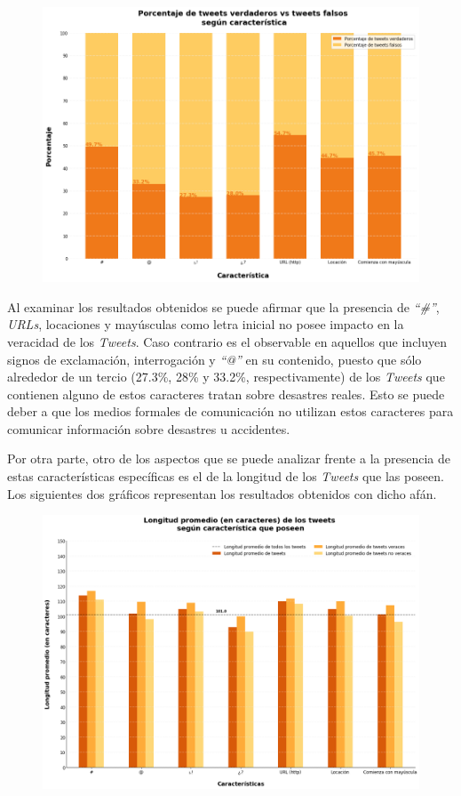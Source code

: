 \documentclass[titlepage,a4paper]{article}
\begin{document}
    \begin{figure}[H]
    \centering
    \includegraphics[width=1\textwidth]{graficos/Analisis Lexico Grafico/porcentaje_caracteristicas.png}
    \caption{} 
    \end{figure}
    
    Al examinar los resultados obtenidos se puede afirmar que la presencia de \textit{``\#''}, \textit{URLs}, locaciones y mayúsculas como letra inicial no posee impacto en la veracidad de los \textit{Tweets}. Caso contrario es el observable en aquellos que incluyen signos de exclamación, interrogación y \textit{``@''} en su contenido, puesto que sólo alrededor de un tercio (27.3\%, 28\% y 33.2\%, respectivamente) de los \textit{Tweets} que contienen alguno de estos caracteres tratan sobre desastres reales. Esto se puede deber a que los medios formales de comunicación no utilizan estos caracteres para comunicar información sobre desastres u accidentes.
    
    Por otra parte, otro de los aspectos que se puede analizar frente a la presencia de estas características específicas es el de la longitud de los \textit{Tweets} que las poseen. Los siguientes dos gráficos representan los resultados obtenidos con dicho afán.

    \begin{figure}[H]
    \centering
    \includegraphics[width=.9\textwidth]{graficos/Analisis Lexico Grafico/long_promedio_char_tweets_segun_caracteristica.png}
    \caption{} 
    \end{figure}
    
\end{document}
